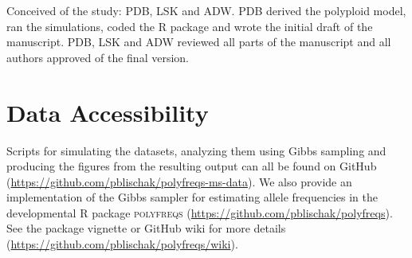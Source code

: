 \documentclass[11pt,english,letterpaper,oneside]{article}
\begin{document}
Conceived of the study: PDB, LSK and ADW. PDB derived the polyploid model, ran the simulations, coded the R package and wrote the initial draft of the manuscript. PDB, LSK and ADW reviewed all parts of the manuscript and all authors approved of the final version.
\medskip

\section*{Data Accessibility}            %

Scripts for simulating the datasets, analyzing them using Gibbs sampling and producing the figures from the resulting output can all be found on GitHub (\url{https://github.com/pblischak/polyfreqs-ms-data}). We also provide an implementation of the Gibbs sampler for estimating allele frequencies in the developmental R package \textsc{polyfreqs} (\url{https://github.com/pblischak/polyfreqs}). See the package vignette or GitHub wiki for more details (\url{https://github.com/pblischak/polyfreqs/wiki}).
\newpage

\end{document}
